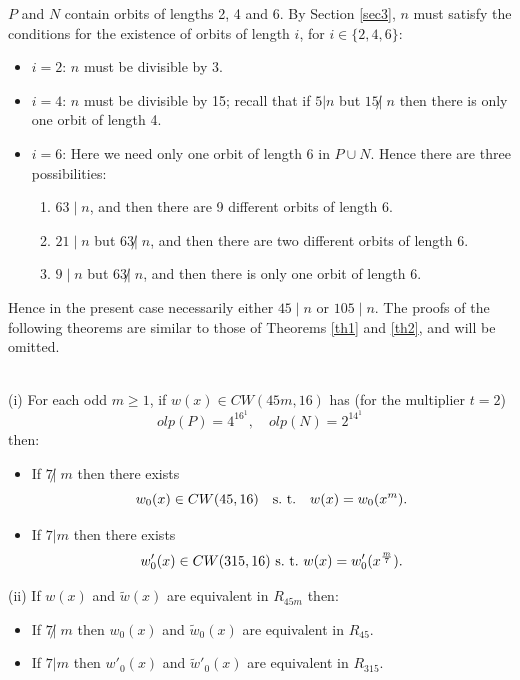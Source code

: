 {{{\begin{enumerate}
	 $P$ and $N$ contain orbits of lengths 2, 4 and  6.
	 By Section \ref{sec3}, $n$ must satisfy the conditions for the existence  
	 of orbits of length $i$, for $i \in \{2,4,6\}$: 
	 \begin{itemize}
	     \item \underline{$i=2$}: $n$ must be divisible by 3.
	     \item \underline{$i=4$}: $n$ must be divisible by 15; recall that if $5|n$ but 
		$15 \not| \; n$ then there is only one orbit of length 4.
	     \item \underline{$i=6$}: Here we need only one 
	     orbit of length 6 in $P \cup N$. Hence there are three possibilities: 
	     \begin{enumerate}
	\item $63 \mid n$, and then there are 9 different orbits of length 6.
	\item $21 \mid n$ but $63 \not| \; n$, and then there are 
	     two different orbits of length 6.    
	\item $9 \mid n$ but $63 \not| \; n $, and then there is only one 
	     orbit of length 6. 
	\end{enumerate}
	 
	 \end{itemize}
	 
	 Hence in the present case necessarily either $45 \mid n$ or $105 \mid n$.
	 The proofs of the following theorems are similar to those of Theorems  
	 \ref{th1} and \ref{th2}, and will be omitted. 


\begin{thm} \label{th3}
{ \ }\\
(i)    For each odd $m \geq1 $, if $w(x) \in CW(45m,16)$ has (for the 
       multiplier $t=2$) 
		$$olp(P)=4^16^1, \quad olp(N)=2^14^1$$ 
       then:
       \begin{itemize}
	\item If $7 \not| \; m$ then there exists 
		$$w_0(x) \in CW(45,16) \quad {\rm s. \ t.} \quad w(x)=w_0(x^m).$$ 
	\item If $7 | m$ then there exists  
	$$w'_0(x) \in CW(315,16) \ {\rm s. \ t.} \ w(x)=w'_0(x^{\frac{m}{7}}).$$ 
	\end{itemize}
      
(ii)  If $w(x)$ and $\widetilde{w}(x)$ are equivalent in $R_{45m}$ then: 
	\begin{itemize}
	  \item 
		If  $7 \not| \; m$ then $w_0(x)$ and $\widetilde{w}_0(x)$ are 
		equivalent in $R_{45}$. 
	  \item 
		If $7 | m$ then $w'_0(x)$ and $\widetilde{w}'_0(x)$ are 
		equivalent in $R_{315}$. 
		

\end{itemize}
\end{thm}
\end{enumerate}}}}
